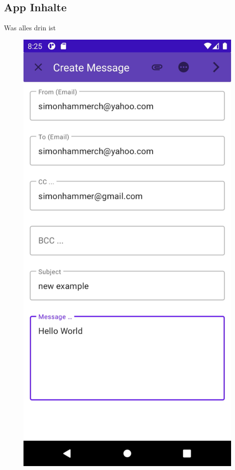 \documentclass[aspectratio=169]{beamer}
\begin{document}
\subsection{App Inhalte}
\begin{frame}[plain]{Was alles drin ist}
    \centering
    \begin{figure}[h]
        \pause
        \includegraphics[height=.7\textheight]{media/emailWriter.jpg}

\end{figure}
\end{frame}
\end{document}
